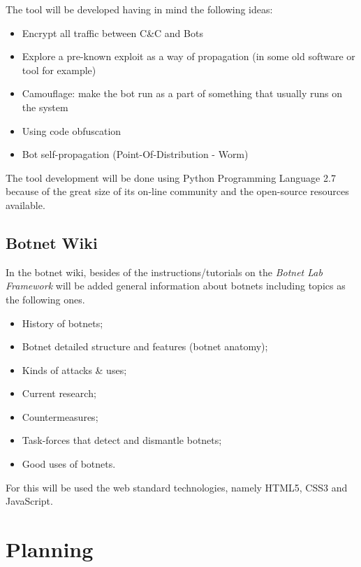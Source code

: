 \documentclass[]{article}
\begin{document}
The tool will be developed having in mind the following ideas:
\begin{itemize}
	\item Encrypt all traffic between C\&C and Bots
	\item Explore a pre-known exploit as a way of propagation (in some old software or tool for example)
	\item Camouflage: make the bot run as a part of something that usually runs on the system
	\item Using code obfuscation
	\item Bot self-propagation (Point-Of-Distribution - Worm)
\end{itemize}

The tool development will be done using Python Programming Language 2.7 \cite{app:python} because of the great size of its on-line community and the open-source resources available.

\subsection{Botnet Wiki}

In the botnet wiki, besides of the instructions/tutorials on the \textit{Botnet Lab Framework} will be added general information about botnets including topics as the following ones.
\begin{itemize}
	\item History of botnets;
	\item Botnet detailed structure and features (botnet anatomy);
	\item Kinds of attacks \& uses;
	\item Current research;
	\item Countermeasures;
	\item Task-forces that detect and dismantle botnets;
	\item Good uses of botnets.
\end{itemize}

For this will be used the web standard technologies, namely HTML5, CSS3 and JavaScript.

\section{Planning}


 
\end{document}
